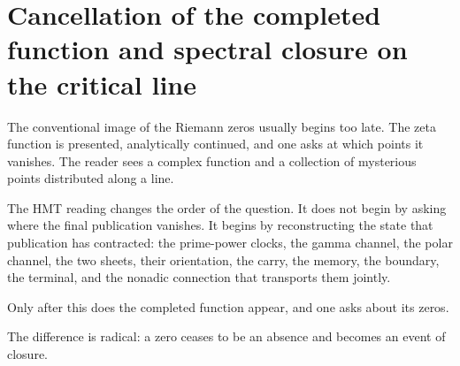 \section{Cancellation of the completed function and spectral closure on the critical line}
The conventional image of the Riemann zeros usually begins too late. The zeta function is presented, analytically continued, and one asks at which points it vanishes. The reader sees a complex function and a collection of mysterious points distributed along a line.\par
The HMT reading changes the order of the question. It does not begin by asking where the final publication vanishes. It begins by reconstructing the state that publication has contracted: the prime-power clocks, the gamma channel, the polar channel, the two sheets, their orientation, the carry, the memory, the boundary, the terminal, and the nonadic connection that transports them jointly.\par
Only after this does the completed function appear, and one asks about its zeros.\par
The difference is radical: a zero ceases to be an absence and becomes an event of closure.\par
{}
